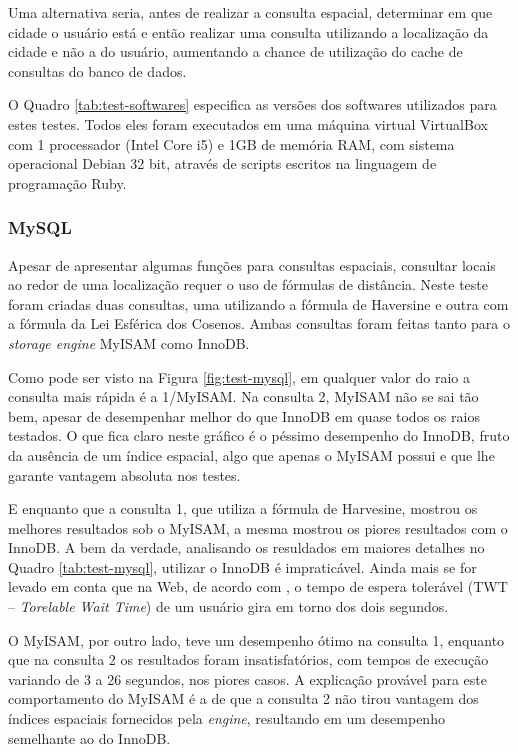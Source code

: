 \documentclass[diss]{template/setrem}
\begin{document}
Uma alternativa seria, antes de realizar a consulta espacial, determinar em que cidade o usuário está e então realizar uma consulta utilizando a localização da cidade e não a do usuário, aumentando a chance de utilização do cache de consultas do banco de dados.

O Quadro \ref{tab:test-softwares} especifica as versões dos softwares utilizados para estes testes. Todos eles foram executados em uma máquina virtual VirtualBox com 1 processador (Intel Core i5) e 1GB de memória RAM, com sistema operacional Debian 32 bit, através de scripts escritos na linguagem de programação Ruby.

\subsubsection{MySQL}
Apesar de apresentar algumas funções para consultas espaciais, consultar locais ao redor de uma localização requer o uso de fórmulas de distância. Neste teste foram criadas duas consultas, uma utilizando a fórmula de Haversine e outra com a fórmula da Lei Esférica dos Cosenos. Ambas consultas foram feitas tanto para o \emph{storage engine} MyISAM como InnoDB.

Como pode ser visto na Figura \ref{fig:test-mysql}, em qualquer valor do raio a consulta mais rápida é a 1/MyISAM. Na consulta 2, MyISAM não se sai tão bem, apesar de desempenhar melhor do que InnoDB em quase todos os raios testados. O que fica claro neste gráfico é o péssimo desempenho do InnoDB, fruto da ausência de um índice espacial, algo que apenas o MyISAM possui e que lhe garante vantagem absoluta nos testes.

E enquanto que a consulta 1, que utiliza a fórmula de Harvesine, mostrou os melhores resultados sob o MyISAM, a mesma mostrou os piores resultados com o InnoDB. A bem da verdade, analisando os resuldados em maiores detalhes no Quadro \ref{tab:test-mysql}, utilizar o InnoDB é impraticável. Ainda mais se for levado em conta que na Web, de acordo com \citet{WebsiteOptimization2008}, o tempo de espera tolerável (TWT -- \emph{Torelable Wait Time}) de um usuário gira em torno dos dois segundos.

O MyISAM, por outro lado, teve um desempenho ótimo na consulta 1, enquanto que na consulta 2 os resultados foram insatisfatórios, com tempos de execução variando de 3 a 26 segundos, nos piores casos. A explicação provável para este comportamento do MyISAM é a de que a consulta 2 não tirou vantagem dos índices espaciais fornecidos pela \emph{engine}, resultando em um desempenho semelhante ao do InnoDB.
\end{document}
